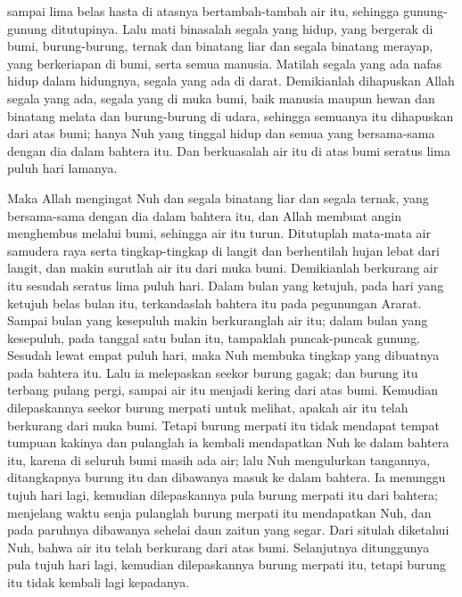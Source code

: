 \begin{biblechapter}
\verse sampai lima belas hasta di atasnya bertambah-tambah air itu, sehingga gunung-gunung ditutupinya.
\verse Lalu mati binasalah segala yang hidup, yang bergerak di bumi, burung-burung, ternak dan binatang liar dan segala binatang merayap, yang berkeriapan di bumi, serta semua manusia.
\verse Matilah segala yang ada nafas hidup dalam hidungnya, segala yang ada di darat.
\verse Demikianlah dihapuskan Allah segala yang ada, segala yang di muka bumi, baik manusia maupun hewan dan binatang melata dan burung-burung di udara, sehingga semuanya itu dihapuskan dari atas bumi; hanya Nuh yang tinggal hidup dan semua yang bersama-sama dengan dia dalam bahtera itu.
\verse Dan berkuasalah air itu di atas bumi seratus lima puluh hari lamanya.
\end{biblechapter}

\begin{biblechapter} %
 Maka Allah mengingat Nuh dan segala binatang liar dan segala ternak, yang bersama-sama dengan dia dalam bahtera itu, dan Allah membuat angin menghembus melalui bumi, sehingga air itu turun.
\verse Ditutuplah mata-mata air samudera raya serta tingkap-tingkap di langit dan berhentilah hujan lebat dari langit,
\verse dan makin surutlah air itu dari muka bumi. Demikianlah berkurang air itu sesudah seratus lima puluh hari.
\verse Dalam bulan yang ketujuh, pada hari yang ketujuh belas bulan itu, terkandaslah bahtera itu pada pegunungan Ararat.
\verse Sampai bulan yang kesepuluh makin berkuranglah air itu; dalam bulan yang kesepuluh, pada tanggal satu bulan itu, tampaklah puncak-puncak gunung.
\verse Sesudah lewat empat puluh hari, maka Nuh membuka tingkap yang dibuatnya pada bahtera itu.
\verse Lalu ia melepaskan seekor burung gagak; dan burung itu terbang pulang pergi, sampai air itu menjadi kering dari atas bumi.
\verse Kemudian dilepaskannya seekor burung merpati untuk melihat, apakah air itu telah berkurang dari muka bumi.
\verse Tetapi burung merpati itu tidak mendapat tempat tumpuan kakinya dan pulanglah ia kembali mendapatkan Nuh ke dalam bahtera itu, karena di seluruh bumi masih ada air; lalu Nuh mengulurkan tangannya, ditangkapnya burung itu dan dibawanya masuk ke dalam bahtera.
\verse Ia menunggu tujuh hari lagi, kemudian dilepaskannya pula burung merpati itu dari bahtera;
\verse menjelang waktu senja pulanglah burung merpati itu mendapatkan Nuh, dan pada paruhnya dibawanya sehelai daun zaitun yang segar. Dari situlah diketahui Nuh, bahwa air itu telah berkurang dari atas bumi.
\verse Selanjutnya ditunggunya pula tujuh hari lagi, kemudian dilepaskannya burung merpati itu, tetapi burung itu tidak kembali lagi kepadanya.

\end{biblechapter}

